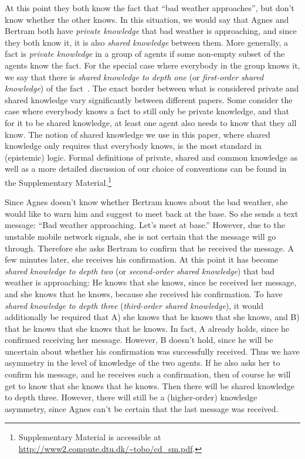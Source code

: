 \documentclass[twocolumn,a4paper,superscriptaddress,nofootinbib]{revtex4}
\begin{document}
At this point they both know the fact that ``bad weather approaches'', but don't know whether the other knows. In this situation, we would say that Agnes and Bertram both have \emph{private knowledge} that bad weather is approaching, and since they both know it, it is also \emph{shared knowledge} between them. More generally, a fact is \emph{private knowledge} in a group of agents if some non-empty subset of the agents know the fact. For the special case where everybody in the group knows it, we say that there is \emph{shared knowledge to depth one} (or \emph{first-order shared knowledge}) of the fact~\citep{clark1981definite}. The exact border between what is considered private and shared knowledge vary significantly between different papers. Some consider the case where everybody knows a fact to still only be private knowledge, and that for it to be shared knowledge, at least one agent also needs to know that they all know. The notion of shared knowledge we use in this paper, where shared knowledge only requires that everybody knows, is the most standard in (epistemic) logic. Formal definitions of private, shared and common knowledge as well as a more detailed discussion of our choice of conventions can be found in the Supplementary Material.\footnote{Supplementary Material is accessible at \url{http://www2.compute.dtu.dk/\~tobo/cd_sm.pdf}.}

Since Agnes doesn't know whether Bertram knows about the bad weather, she would like to warn him and suggest to meet back at the base. So she sends a text message: ``Bad weather approaching. Let's meet at base.'' However, due to the unstable mobile network signals, she is not certain that the message will go through. Therefore she asks Bertram to confirm that he received the  message. A few minutes later, she receives his confirmation. At this point it has become \emph{shared knowledge to depth two} (or \emph{second-order shared knowledge}) that bad weather is approaching: He knows that she knows, since he received her message, and she knows that he knows, because she received his confirmation. To have \emph{shared knowledge to depth three} (\emph{third-order shared knowledge}), it would additionally be required that A) she knows that he knows that she knows, and B) that he knows that she knows that he knows. In fact, A already holds, since he confirmed receiving her message. However, B doesn't hold, since he will be uncertain about whether his confirmation was successfully received. Thus we have asymmetry in the level of knowledge of the two agents. If he also asks her to confirm his message, and he receives such a confirmation, then of course he will get to know that she knows that he knows. Then there will be shared knowledge to depth three. However, there will still be a (higher-order) knowledge asymmetry, since Agnes can't be certain that the last message was received.
\end{document}
